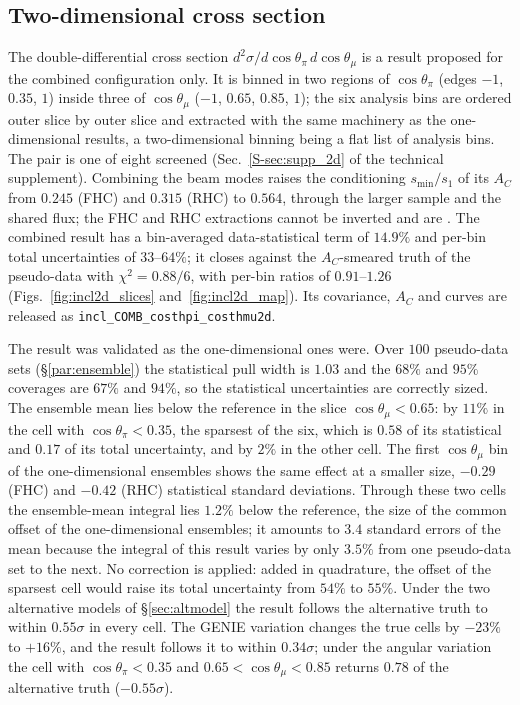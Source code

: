 \documentclass[11pt,a4paper]{article}
\newcommand{\suppref}[2]{#1~\ref{S-#2} of the technical supplement}
\begin{document}
\subsection{Two-dimensional cross section}
\label{sec:incl_2d}

The double-differential cross section $d^2\sigma/d\cos\theta_\pi\,d\cos\theta_\mu$ is a result proposed for the combined configuration only. It is binned in two regions of
$\cos\theta_\pi$ (edges $-1$, $0.35$, $1$) inside three of $\cos\theta_\mu$ ($-1$, $0.65$, $0.85$, $1$);
the six analysis bins are ordered outer slice by outer slice and extracted with the same machinery as
the one-dimensional results, a two-dimensional binning being a flat list of analysis bins. The pair is
one of eight screened (\suppref{Sec.}{sec:supp_2d}). Combining the beam modes raises the conditioning
$s_{\min}/s_1$ of its $A_C$ from $0.245$ (FHC) and $0.315$ (RHC) to $0.564$, through the larger sample
and the shared flux; the FHC and RHC extractions cannot be inverted and are \statNotReported. The
combined result has a bin-averaged data-statistical term of $14.9\%$ and per-bin total uncertainties of
$33$--$64\%$; it closes against the $A_C$-smeared truth of the pseudo-data with $\chi^2=0.88/6$, with
per-bin ratios of $0.91$--$1.26$ (Figs.~\ref{fig:incl2d_slices} and~\ref{fig:incl2d_map}). Its
covariance, $A_C$ and curves are released as \texttt{incl\_COMB\_costhpi\_costhmu2d}.

The result was validated as the one-dimensional ones were. Over $100$ pseudo-data
sets (\S\ref{par:ensemble}) the statistical pull width is $1.03$ and the $68\%$ and $95\%$ coverages are
$67\%$ and $94\%$, so the statistical uncertainties are correctly sized. The ensemble mean lies below the
reference in the slice $\cos\theta_\mu<0.65$: by $11\%$ in the cell with $\cos\theta_\pi<0.35$, the
sparsest of the six, which is $0.58$ of its statistical and $0.17$ of its total uncertainty, and by
$2\%$ in the other cell. The first $\cos\theta_\mu$ bin of the one-dimensional ensembles shows the
same effect at a smaller size, $-0.29$ (FHC) and $-0.42$ (RHC) statistical standard deviations. Through
these two cells the ensemble-mean integral lies $1.2\%$ below the reference, the size of the common
offset of the one-dimensional ensembles; it amounts to $3.4$ standard errors of the mean because the
integral of this result varies by only $3.5\%$ from one pseudo-data set to the next. No correction is
applied: added in quadrature, the offset of the sparsest cell would raise its total uncertainty from
$54\%$ to $55\%$. Under the two alternative models of \S\ref{sec:altmodel} the result follows the
alternative truth to within $0.55\sigma$ in every cell. The GENIE variation changes the true cells by
$-23\%$ to $+16\%$, and the result follows it to within $0.34\sigma$; under the angular variation the
cell with $\cos\theta_\pi<0.35$ and $0.65<\cos\theta_\mu<0.85$ returns $0.78$ of the alternative
truth ($-0.55\sigma$).
\end{document}
